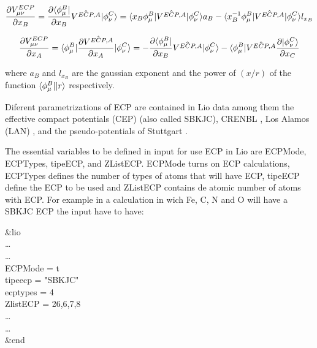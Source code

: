     \begin{equation}
    \begin{split}
        \frac{\partial V^{ECP}_{\mu \nu}}{\partial x_B} = 
        \frac{\partial \langle\phi_\mu^B\rvert}{\partial x_B}{\hat{V^{ECP,A}}}\lvert\phi_\nu^C\rangle
        =\langle x_B \phi_\mu^B\rvert{\hat{V^{ECP,A}}}\lvert\phi_\nu^C\rangle a_B
        - \langle x_B^{-1} \phi_\mu^B\rvert{\hat{V^{ECP,A}}}\lvert\phi_\nu^C\rangle l_{x_B}
    \end{split}
    \end{equation}
    
    \begin{equation}
    \begin{split}
        \frac{\partial V^{ECP}_{\mu \nu}}{\partial x_A} = 
        \langle\phi_\mu^B\rvert{\frac{\partial \hat{V^{ECP,A}}}{\partial x_A}}\lvert\phi_\nu^C\rangle
        = - \frac{\partial\langle\phi_\mu^B\rvert}{\partial x_B}{\hat{V^{ECP,A}}}\lvert\phi_\nu^C\rangle - \langle\phi_\mu^B\rvert{\hat{V^{ECP,A}}}\frac{\partial\lvert\phi_\nu^C\rangle}{\partial x_C}
    \end{split}
    \end{equation}

where $a_B$ and $l_{x_B}$ are the gaussian exponent and the power of $(x/r)$ of the function $ \langle\phi_\mu^B\rvert\lvert r\rangle$ respectively.

Diferent parametrizations of ECP are contained in Lio data among them the effective compact potentials (CEP) \cite {CEP2, CEP1, CEP3} (also called SBKJC), CRENBL \cite{CRENBL1, CRENBL2, CRENBL4, CRENBL5}, Los Alamos (LAN) \cite{LAN1,LAN2,LAN3}, and the pseudo-potentials of Stuttgart \cite{stuttgart}.

The essential variables to be defined in input for use ECP in Lio are ECPMode, ECPTypes, tipeECP, and ZListECP. ECPMode turns on ECP calculations, ECPTypes defines the number of types of atoms that will have ECP, tipeECP define the ECP to be used and ZListECP contains de atomic number of atoms with ECP. For example in a calculation in wich Fe, C, N and O will have a SBKJC ECP the input have to have:

    \begin{center}
    \begin{tcolorbox}[title=,width=\linewidth/2,center title]
\&lio\\
\dots\\
\dots\\
 ECPMode            = t\\
 tipeecp            = "SBKJC"\\
 ecptypes           = 4\\
 ZlistECP           = 26,6,7,8\\
\dots\\
\dots\\
\&end 
    \end{tcolorbox}
    \end{center}

